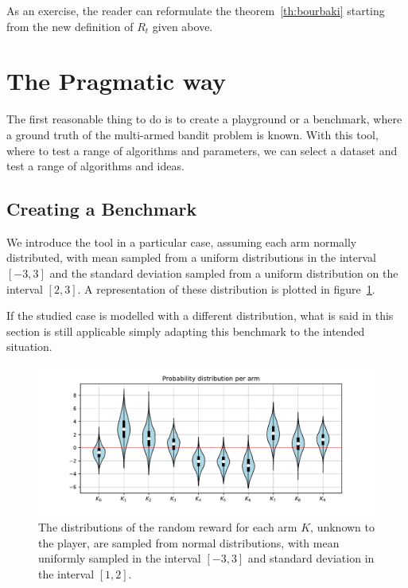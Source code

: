 \documentclass[]{scrartcl}
\theoremstyle{definition}
\begin{document}
\noindent
As an exercise, the reader can reformulate the theorem~\ref{th:bourbaki} starting from the new definition of $R_t$ given above.


\section{The Pragmatic way}
\label{se:pragmatic_perspective}

The first reasonable thing to do is to create a playground or a benchmark, where a ground truth of the multi-armed bandit problem is known. With this tool, where to test a range of algorithms and parameters, we can select a dataset and test a range of algorithms and ideas.

\subsection*{Creating a Benchmark}

We introduce the tool in a particular case, assuming each arm normally distributed, with mean sampled from a uniform distributions in the interval $[-3, 3]$ and the standard deviation sampled from a uniform distribution on the interval $[2, 3]$. A representation of these distribution is plotted in
figure~\ref{fig:volin_plot}.

If the studied case is modelled with a different distribution, what is said in this section is still applicable simply adapting this benchmark to the intended situation.

\begin{figure}[h]
    \hspace{-1.5cm}
    \includegraphics[width=18cm]{figures/initial_distributions.pdf}
    \caption{The distributions of the random reward for each arm $K$, unknown to the player, are sampled from normal distributions, with mean uniformly sampled in the interval $[-3, 3]$ and standard deviation in the interval $[1, 2]$.}
    \label{fig:volin_plot}
\end{figure}
\end{document}
